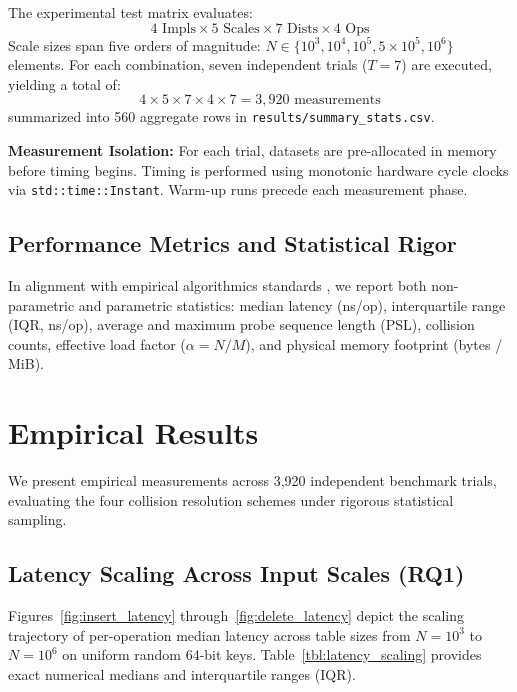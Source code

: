 \documentclass[conference]{IEEEtran}
\begin{document}
The experimental test matrix evaluates:
\begin{equation}
4 \text{ Impls} \times 5 \text{ Scales} \times 7 \text{ Dists} \times 4 \text{ Ops}
\end{equation}
Scale sizes span five orders of magnitude: $N \in \{10^3, 10^4, 10^5, 5 \times 10^5, 10^6\}$ elements. For each combination, seven independent trials ($T = 7$) are executed, yielding a total of:
\begin{equation}
4 \times 5 \times 7 \times 4 \times 7 = 3,920 \text{ measurements}
\end{equation}
summarized into 560 aggregate rows in \texttt{results/summary\_stats.csv}.

\textbf{Measurement Isolation:} For each trial, datasets are pre-allocated in memory before timing begins. Timing is performed using monotonic hardware cycle clocks via \texttt{std::time::Instant}. Warm-up runs precede each measurement phase.

\subsection{Performance Metrics and Statistical Rigor}

In alignment with empirical algorithmics standards \cite{sedgewick2011}, we report both non-parametric and parametric statistics: median latency (ns/op), interquartile range (IQR, ns/op), average and maximum probe sequence length (PSL), collision counts, effective load factor ($\alpha = N / M$), and physical memory footprint (bytes / MiB).

\section{Empirical Results}

We present empirical measurements across 3,920 independent benchmark trials, evaluating the four collision resolution schemes under rigorous statistical sampling.

\subsection{Latency Scaling Across Input Scales (RQ1)}

Figures~\ref{fig:insert_latency} through~\ref{fig:delete_latency} depict the scaling trajectory of per-operation median latency across table sizes from $N = 10^3$ to $N = 10^6$ on uniform random 64-bit keys. Table~\ref{tbl:latency_scaling} provides exact numerical medians and interquartile ranges (IQR).
\end{document}
